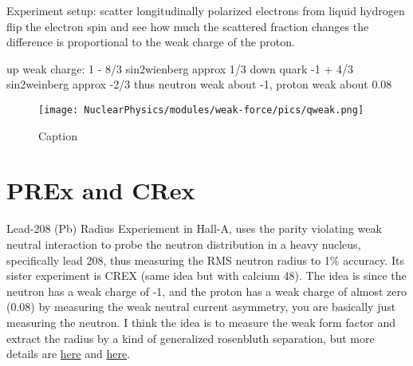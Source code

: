                 Experiment setup:
                scatter longitudinally polarized electrons from liquid hydrogen
                flip the electron spin and see how much the scattered fraction changes
                the difference is proportional to the weak charge of the proton.
                
                up weak charge: 1 - 8/3 sin2wienberg approx 1/3
                down quark -1 + 4/3 sin2weinberg approx -2/3
                thus neutron weak about -1, proton weak about 0.08
                
                
                \begin{figure}[H]
                    \centering
                    \texttt{[image: NuclearPhysics/modules/weak-force/pics/qweak.png]}
                \caption{Caption}
                \end{figure}
                
                
            
            \section{PREx and CRex}
                Lead-208 (Pb) Radius Experiement in Hall-A, uses the parity violating weak neutral interaction to probe the neutron distribution in a heavy nucleus, specifically lead 208, thus measuring the RMS neutron radius to 1\% accuracy. Its sister experiment is CREX (same idea but with calcium 48). The idea is since the neutron has a weak charge of -1, and the proton has a weak charge of almost zero (0.08) by measuring the weak neutral current asymmetry, you are basically just measuring the neutron.  I think the idea is to measure the weak form factor and extract the radius by a kind of generalized rosenbluth separation, but more details are \href{https://hallaweb.jlab.org/parity/prex/}{here} and \href{https://hallaweb.jlab.org/parity/prex/prexI_prc.pdf}{here}.
                